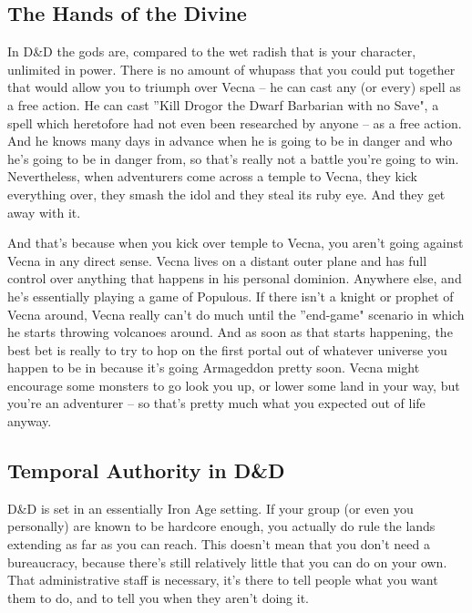 \subsection{The Hands of the Divine}

In D\&D the gods are, compared to the wet radish that is your character, unlimited in power. There is no amount of whupass that you could put together that would allow you to triumph over Vecna -- he can cast any (or every) spell as a free action. He can cast ''Kill Drogor the Dwarf Barbarian with no Save", a spell which heretofore had not even been researched by anyone -- as a free action. And he knows many days in advance when he is going to be in danger and who he's going to be in danger from, so that's really not a battle you're going to win. Nevertheless, when adventurers come across a temple to Vecna, they kick everything over, they smash the idol and they steal its ruby eye. And they get away with it.

And that's because when you kick over temple to Vecna, you aren't going against Vecna in any direct sense. Vecna lives on a distant outer plane and has full control over anything that happens in his personal dominion. Anywhere else, and he's essentially playing a game of Populous. If there isn't a knight or prophet of Vecna around, Vecna really can't do much until the ''end-game" scenario in which he starts throwing volcanoes around. And as soon as that starts happening, the best bet is really to try to hop on the first portal out of whatever universe you happen to be in because it's going Armageddon pretty soon. Vecna might encourage some monsters to go look you up, or lower some land in your way, but you're an adventurer -- so that's pretty much what you expected out of life anyway.

\subsection{Temporal Authority in D\&D}
\vspace*{-8pt}

D\&D is set in an essentially Iron Age setting. If your group (or even you personally) are known to be hardcore enough, you actually do rule the lands extending as far as you can reach. This doesn't mean that you don't need a bureaucracy, because there's still relatively little that you can do on your own. That administrative staff is necessary, it's there to tell people what you want them to do, and to tell you when they aren't doing it.

